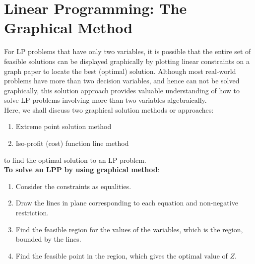 \documentclass[../main-sheet.tex]{subfiles}
\begin{document}
\chapter{Linear Programming: The Graphical Method}

For LP problems that have only two variables, it is possible that the entire set of feasible solutions can be displayed graphically by plotting linear constraints on a graph paper to locate the best (optimal) solution. Although most real-world problems have more than two decision variables, and hence can not be solved graphically, this solution approach provides valuable understanding of how to solve LP problems involving more than two variables algebraically.\\


Here, we shall discuss two graphical solution methods or approaches:
\begin{enumerate}[label=(\roman*)]
    \item Extreme point solution method
    \item Iso-profit (cost) function line method
\end{enumerate}
to find the optimal solution to an LP problem.\\

\textbf{To solve an LPP by using graphical method}:
\begin{enumerate}
    \item Consider the constraints as equalities.
    \item Draw the lines in plane corresponding to each equation and non-negative restriction.
    \item Find the feasible region for the values of the variables, which is the region, bounded by the lines.
    \item Find the feasible point in the region, which gives the optimal value of \(Z\).
\end{enumerate}
\end{document}
